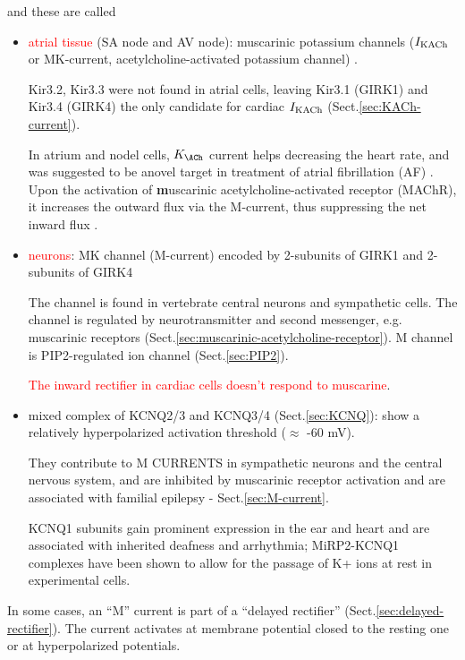 and these are called

\begin{itemize}

  \item \textcolor{red}{atrial tissue} (SA node and AV node):  muscarinic
  potassium channels ($I_{\text{{KACh}}}$ or MK-current, acetylcholine-activated potassium
  channel) .

Kir3.2, Kir3.3 were not found in atrial cells, leaving Kir3.1 (GIRK1) and Kir3.4
(GIRK4) the only candidate for cardiac $I_{\text{{KACh}}}$ (Sect.\ref{sec:KACh-current}).

In atrium and nodel cells, $K_\ACh$ current helps decreasing the heart rate, and
was suggested to be anovel target in treatment of atrial fibrillation (AF)
\citep{walsh2010}. Upon the activation of {\bf m}uscarinic
acetylcholine-activated receptor (MAChR), it increases the outward flux via the
M-current, thus suppressing the net inward flux \citep{adams1982}.

  
  \item \textcolor{red}{neurons}: MK channel (M-current) encoded by 2-subunits
  of GIRK1 and 2-subunits of GIRK4

The channel is found in vertebrate central neurons and sympathetic cells.
The channel is regulated by neurotransmitter and second messenger, e.g.
muscarinic receptors (Sect.\ref{sec:muscarinic-acetylcholine-receptor}).
M channel is PIP2-regulated ion channel (Sect.\ref{sec:PIP2}).


\textcolor{red}{The inward rectifier in cardiac cells doesn't respond to
  muscarine}\citep{sakmann1983aas}.

    \item  mixed complex of KCNQ2/3 and KCNQ3/4 (Sect.\ref{sec:KCNQ}): show a
    relatively hyperpolarized activation threshold ($\approx$ -60 mV).

They contribute to M CURRENTS in sympathetic neurons and the central nervous
system, and are inhibited by muscarinic receptor activation and are associated
with familial epilepsy - Sect.\ref{sec:M-current}.
     
KCNQ1 subunits gain prominent expression in the ear and heart and are associated
with inherited deafness and arrhythmia; MiRP2-KCNQ1 complexes have been shown to
allow for the passage of K+ ions at rest in experimental cells.

     
\end{itemize}
In some cases, an ``M'' current is part of a ``delayed rectifier''
(Sect.\ref{sec:delayed-rectifier}). The current activates at membrane potential
closed to the resting one or at hyperpolarized potentials.

